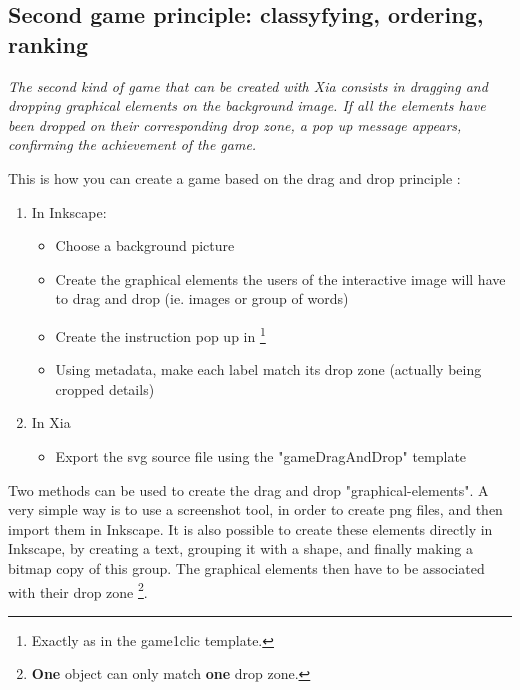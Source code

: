 \subsection{Second game principle: classyfying, ordering, ranking}\label{gameDragAndDropsection}

\textit{The second kind of game that can be created with Xia consists in
dragging and dropping graphical elements on the background image. If all the
elements have been dropped on their corresponding drop zone, a pop up
message appears, confirming the achievement of the game.}


This is how you can create a game based on the drag and drop principle :
\begin{enumerate}
 \item In Inkscape:
\begin{itemize}
 \item Choose a background picture
 \item Create the graphical elements the users of the interactive image will have to drag and drop (ie. images or group of words)
 \item Create the instruction pop up in \footnote{Exactly as in the game1clic template.}
 \item Using metadata, make each label match its drop zone (actually being cropped details)
\end{itemize}
 \item In Xia
 \begin{itemize}
  \item Export the svg source file using the "gameDragAndDrop" template
 \end{itemize}
\end{enumerate}

Two methods can be used to create the drag and drop "graphical-elements".
A very simple way is to use a screenshot tool, in order to create png files, and then import them in Inkscape.
It is also possible to create these elements directly in Inkscape, by creating a text, grouping it with a shape,
and finally making a bitmap copy of this group.
The graphical elements then have to be associated with their drop zone \footnote{\textbf{One} object can only match \textbf{one} drop zone.}.

